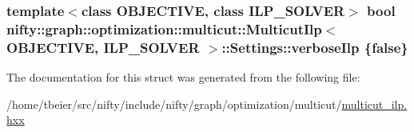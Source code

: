 \subsubsection[{verbose\+Ilp}]{\setlength{\rightskip}{0pt plus 5cm}template$<$class O\+B\+J\+E\+C\+T\+I\+V\+E, class I\+L\+P\+\_\+\+S\+O\+L\+V\+E\+R$>$ bool {\bf nifty\+::graph\+::optimization\+::multicut\+::\+Multicut\+Ilp}$<$ O\+B\+J\+E\+C\+T\+I\+V\+E, I\+L\+P\+\_\+\+S\+O\+L\+V\+E\+R $>$\+::Settings\+::verbose\+Ilp \{false\}}\label{structnifty_1_1graph_1_1optimization_1_1multicut_1_1MulticutIlp_1_1Settings_a5261ee487cde7d6a6f37d8858aa1264a}


The documentation for this struct was generated from the following file\+:\begin{DoxyCompactItemize}
\item 
/home/tbeier/src/nifty/include/nifty/graph/optimization/multicut/\hyperlink{multicut__ilp_8hxx}{multicut\+\_\+ilp.\+hxx}\end{DoxyCompactItemize}
